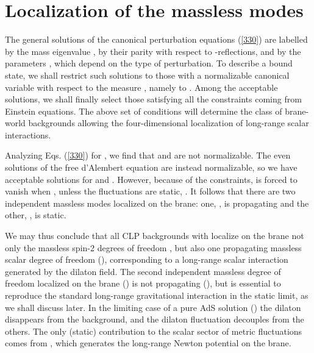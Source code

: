\documentclass[a4paper,12pt]{article}
\begin{document}
\section{Localization of the massless modes}

The general solutions of the canonical perturbation equations
(\ref{330}) are labelled by the mass eigenvalue \coordHE{}, by their
parity with respect to \coordHE{}-reflections, and by the parameters
\coordHE{}, which depend on the type of perturbation. To
describe a bound state, we shall restrict such solutions to those
with a normalizable canonical variable with respect to the measure
\coordHE{}, namely to \coordHE{}. Among the acceptable
solutions, we shall finally select those satisfying all the
constraints coming from Einstein equations. The above set of
conditions will determine the class of brane-world backgrounds
allowing the four-dimensional localization of long-range scalar
interactions.

Analyzing Eqs. (\ref{330}) for \coordHE{}, we find that \coordHE{} and \coordHE{}
are not normalizable. The even solutions of the free d'Alembert equation
are instead normalizable, so we have acceptable solutions  for
\coordHE{} and \coordHE{}. However, because of the constraints,
\coordHE{} is forced to vanish when \coordHE{}, unless the fluctuations
are static, \coordHE{}. It follows that there are two
independent massless modes localized on the brane: one,
\coordHE{}, is propagating and the other, \coordHE{},  is static.

We may thus conclude that all CLP backgrounds with \coordHE{} localize on the brane not only the massless spin-2
degrees of freedom \cite{CLP}, but also one propagating massless
scalar degree of freedom (\coordHE{}), corresponding to a long-range
scalar interaction generated by the dilaton field. The second
independent massless degree of freedom localized on the brane
(\coordHE{}) is not propagating (\coordHE{}), but is essential
to reproduce the standard long-range gravitational interaction in the
static limit, as we shall discuss later. In the limiting case of a pure
AdS\coordHE{} solution  (\coordHE{}) the dilaton disappears from the
background, and the dilaton fluctuation \coordHE{} decouples
from the others. The only (static) contribution to the scalar
sector of metric fluctuations comes from \coordHE{}, which
generates the long-range Newton potential \myHighlight{$\varphi=\psi$}\coordHE{} on the
brane.
\end{document}
